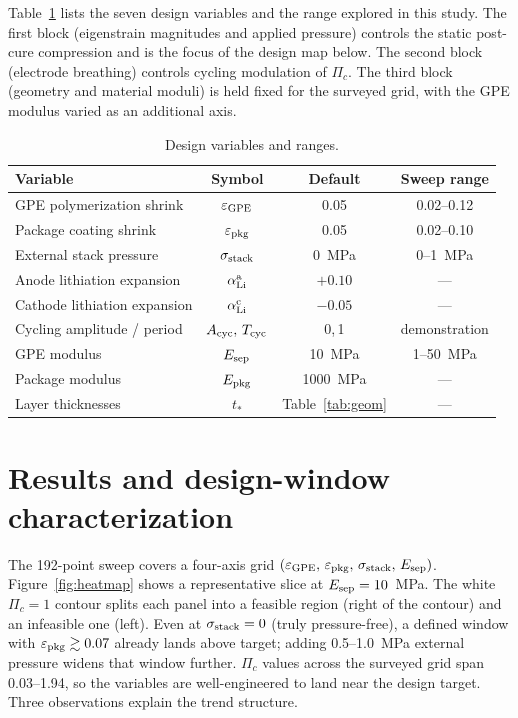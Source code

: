 \documentclass[11pt,letterpaper]{article}
\begin{document}
Table~\ref{tab:design-vars} lists the seven design variables and the
range explored in this study.  The first block (eigenstrain magnitudes
and applied pressure) controls the static post-cure compression and is
the focus of the design map below.  The second block (electrode
breathing) controls cycling modulation of $\Pi_c$.  The third block
(geometry and material moduli) is held fixed for the surveyed grid,
with the GPE modulus varied as an additional axis.

\begin{table}[H]
\centering
\caption{Design variables and ranges.}
\label{tab:design-vars}
\begin{tabular}{lccc}
\toprule
Variable & Symbol & Default & Sweep range \\
\midrule
GPE polymerization shrink     & $\varepsilon_{\rm GPE}$  & 0.05 & 0.02--0.12 \\
Package coating shrink        & $\varepsilon_{\rm pkg}$  & 0.05 & 0.02--0.10 \\
External stack pressure       & $\sigma_{\rm stack}$     & 0~MPa & 0--1~MPa \\
\midrule
Anode lithiation expansion    & $\alpha_{\rm Li}^{\rm a}$ & $+0.10$ & --- \\
Cathode lithiation expansion  & $\alpha_{\rm Li}^{\rm c}$ & $-0.05$ & --- \\
Cycling amplitude / period    & $A_{\rm cyc},\,T_{\rm cyc}$ & 0,\,1 & demonstration \\
\midrule
GPE modulus                   & $E_{\rm sep}$            & 10~MPa  & 1--50~MPa \\
Package modulus               & $E_{\rm pkg}$            & 1000~MPa & --- \\
Layer thicknesses             & $t_*$                    & Table~\ref{tab:geom} & --- \\
\bottomrule
\end{tabular}
\end{table}

\section{Results and design-window characterization}

The 192-point sweep covers a four-axis grid
$(\varepsilon_{\rm GPE},\,\varepsilon_{\rm pkg},\,\sigma_{\rm stack},\,
E_{\rm sep})$.  Figure~\ref{fig:heatmap} shows a representative slice
at $E_{\rm sep} = 10$~MPa.  The white $\Pi_c = 1$ contour splits each
panel into a feasible region (right of the contour) and an infeasible
one (left).  Even at $\sigma_{\rm stack} = 0$ (truly pressure-free), a
defined window with $\varepsilon_{\rm pkg} \gtrsim 0.07$ already lands
above target; adding 0.5--1.0~MPa external pressure widens that window
further.  $\Pi_c$ values across the surveyed grid span 0.03--1.94, so
the variables are well-engineered to land near the design target.
Three observations explain the trend structure.
\end{document}
